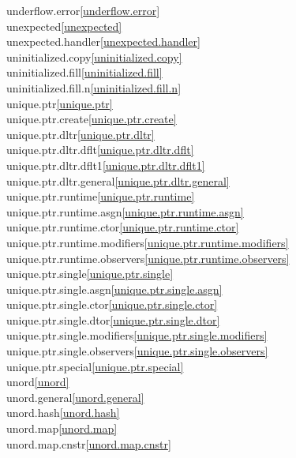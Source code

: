 \begin{multicols}{2}
underflow.error\quad\ref{underflow.error}\\
unexpected\quad\ref{unexpected}\\
unexpected.handler\quad\ref{unexpected.handler}\\
uninitialized.copy\quad\ref{uninitialized.copy}\\
uninitialized.fill\quad\ref{uninitialized.fill}\\
uninitialized.fill.n\quad\ref{uninitialized.fill.n}\\
unique.ptr\quad\ref{unique.ptr}\\
unique.ptr.create\quad\ref{unique.ptr.create}\\
unique.ptr.dltr\quad\ref{unique.ptr.dltr}\\
unique.ptr.dltr.dflt\quad\ref{unique.ptr.dltr.dflt}\\
unique.ptr.dltr.dflt1\quad\ref{unique.ptr.dltr.dflt1}\\
unique.ptr.dltr.general\quad\ref{unique.ptr.dltr.general}\\
unique.ptr.runtime\quad\ref{unique.ptr.runtime}\\
unique.ptr.runtime.asgn\quad\ref{unique.ptr.runtime.asgn}\\
unique.ptr.runtime.ctor\quad\ref{unique.ptr.runtime.ctor}\\
unique.ptr.runtime.modifiers\quad\ref{unique.ptr.runtime.modifiers}\\
unique.ptr.runtime.observers\quad\ref{unique.ptr.runtime.observers}\\
unique.ptr.single\quad\ref{unique.ptr.single}\\
unique.ptr.single.asgn\quad\ref{unique.ptr.single.asgn}\\
unique.ptr.single.ctor\quad\ref{unique.ptr.single.ctor}\\
unique.ptr.single.dtor\quad\ref{unique.ptr.single.dtor}\\
unique.ptr.single.modifiers\quad\ref{unique.ptr.single.modifiers}\\
unique.ptr.single.observers\quad\ref{unique.ptr.single.observers}\\
unique.ptr.special\quad\ref{unique.ptr.special}\\
unord\quad\ref{unord}\\
unord.general\quad\ref{unord.general}\\
unord.hash\quad\ref{unord.hash}\\
unord.map\quad\ref{unord.map}\\
unord.map.cnstr\quad\ref{unord.map.cnstr}\\

\end{multicols}
